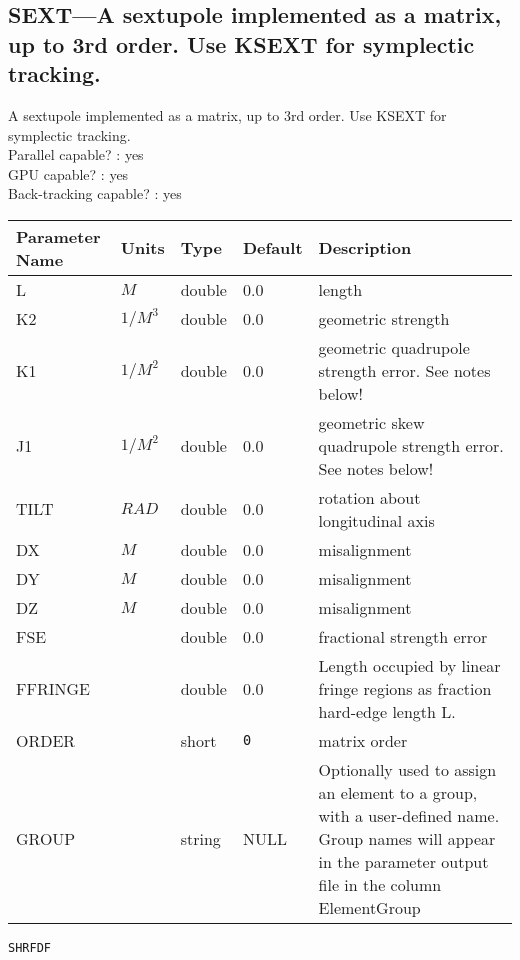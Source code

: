 \subsection{SEXT---A sextupole implemented as a matrix, up to 3rd order. Use KSEXT for symplectic tracking.}
A sextupole implemented as a matrix, up to 3rd order. Use KSEXT for symplectic tracking.
\\
Parallel capable? : yes\\
GPU capable? : yes\\
Back-tracking capable? : yes\\
\begin{tabular}{|l|l|l|l|p{\descwidth}|} \hline
Parameter Name & Units & Type & Default & Description \\ \hline 
L & $M$ & double &  0.0 & length  \\ \hline 
K2 & $1/M^{3}$ & double &  0.0 & geometric strength  \\ \hline 
K1 & $1/M^{2}$ & double &  0.0 & geometric quadrupole strength error. See notes below!  \\ \hline 
J1 & $1/M^{2}$ & double &  0.0 & geometric skew quadrupole strength error. See notes below!  \\ \hline 
TILT & $RAD$ & double &  0.0 & rotation about longitudinal axis  \\ \hline 
DX & $M$ & double &  0.0 & misalignment  \\ \hline 
DY & $M$ & double &  0.0 & misalignment  \\ \hline 
DZ & $M$ & double &  0.0 & misalignment  \\ \hline 
FSE &  & double &  0.0 & fractional strength error  \\ \hline 
FFRINGE &  & double &  0.0 & Length occupied by linear fringe regions as fraction hard-edge length L.  \\ \hline 
ORDER &  & short &  \verb|0| & matrix order  \\ \hline 
GROUP &  & string & NULL & Optionally used to assign an element to a group, with a user-defined name.  Group names will appear in the parameter output file in the column ElementGroup  \\ \hline 
\end{tabular}

\vspace*{0.5in}

\newpage
\begin{center}{\Large\verb|SHRFDF|}\end{center}

